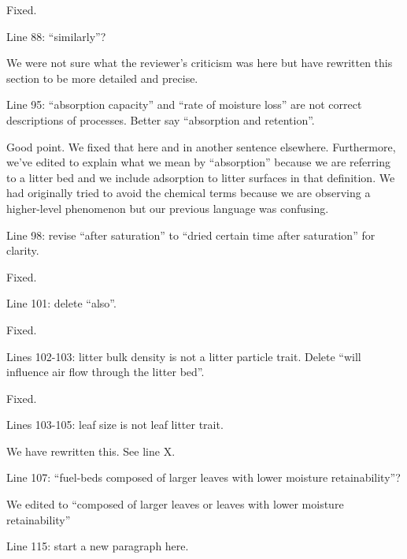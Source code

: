 \documentclass[letterpaper, 12pt]{letter}
\begin{document}
\begin{letter}{}
Fixed.

\begin{quoting}
Line 88: “similarly”?
\end{quoting}

We were not sure what the reviewer's criticism was here but have rewritten this
section to be more detailed and precise.

\begin{quoting}
  Line 95: “absorption capacity” and “rate of moisture loss” are not correct
  descriptions of processes. Better say “absorption and retention”.
\end{quoting}

Good point. We fixed that here and in another sentence elsewhere. Furthermore,
we've edited to explain what we mean by ``absorption'' because we are referring
to a litter bed and we include adsorption to litter surfaces in that
definition. We had originally tried to avoid the chemical terms because we are
observing a higher-level phenomenon but our previous language was confusing.

\begin{quoting}
  Line 98: revise “after saturation” to “dried certain time after saturation”
  for clarity.
\end{quoting}

Fixed.

\begin{quoting}
  Line 101: delete “also”.
\end{quoting}

Fixed.

\begin{quoting}
  Lines 102-103: litter bulk density is not a litter particle trait. Delete
  “will influence air flow through the litter bed”.
\end{quoting}

Fixed.

\begin{quoting}
  Lines 103-105: leaf size is not leaf litter trait.
\end{quoting}

We have rewritten this. See line X.

\begin{quoting}
  Line 107: “fuel-beds composed of larger leaves with lower moisture
  retainability”?
\end{quoting}

We edited to ``composed of larger leaves or leaves with lower moisture
retainability''

\begin{quoting}
  Line 115: start a new paragraph here.
\end{quoting}


\end{letter}
\end{document}
